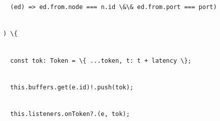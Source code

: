 \documentclass[
]{article}
\newcommand{\passthrough}[1]{#1}
\begin{document}
\passthrough{\lstinline!        !}\passthrough{\lstinline!(!}\passthrough{\lstinline!ed!}\passthrough{\lstinline!)!}\passthrough{\lstinline! !}\passthrough{\lstinline!=>!}\passthrough{\lstinline! !}\passthrough{\lstinline!ed!}\passthrough{\lstinline!.!}\passthrough{\lstinline!from!}\passthrough{\lstinline!.!}\passthrough{\lstinline!node!}\passthrough{\lstinline! !}\passthrough{\lstinline!===!}\passthrough{\lstinline! !}\passthrough{\lstinline!n!}\passthrough{\lstinline!.!}\passthrough{\lstinline!id!}\passthrough{\lstinline! !}\passthrough{\lstinline!\&\&!}\passthrough{\lstinline! !}\passthrough{\lstinline!ed!}\passthrough{\lstinline!.!}\passthrough{\lstinline!from!}\passthrough{\lstinline!.!}\passthrough{\lstinline!port!}\passthrough{\lstinline! !}\passthrough{\lstinline!===!}\passthrough{\lstinline! !}\passthrough{\lstinline!port!}\passthrough{\lstinline!)!}\strut \\
\passthrough{\lstinline!      !}\passthrough{\lstinline!)!}\passthrough{\lstinline! !}\passthrough{\lstinline!\{!}\strut \\
\passthrough{\lstinline!        !}\passthrough{\lstinline!const!}\passthrough{\lstinline! !}\passthrough{\lstinline!tok!}\passthrough{\lstinline!:!}\passthrough{\lstinline! !}\passthrough{\lstinline!Token!}\passthrough{\lstinline! !}\passthrough{\lstinline!=!}\passthrough{\lstinline! !}\passthrough{\lstinline!\{!}\passthrough{\lstinline! !}\passthrough{\lstinline!...!}\passthrough{\lstinline!token!}\passthrough{\lstinline!,!}\passthrough{\lstinline! !}\passthrough{\lstinline!t!}\passthrough{\lstinline!:!}\passthrough{\lstinline! !}\passthrough{\lstinline!t!}\passthrough{\lstinline! !}\passthrough{\lstinline!+!}\passthrough{\lstinline! !}\passthrough{\lstinline!latency!}\passthrough{\lstinline! !}\passthrough{\lstinline!\};!}\strut \\
\passthrough{\lstinline!        !}\passthrough{\lstinline!this!}\passthrough{\lstinline!.!}\passthrough{\lstinline!buffers!}\passthrough{\lstinline!.!}\passthrough{\lstinline!get!}\passthrough{\lstinline!(!}\passthrough{\lstinline!e!}\passthrough{\lstinline!.!}\passthrough{\lstinline!id!}\passthrough{\lstinline")!."}\passthrough{\lstinline!push!}\passthrough{\lstinline!(!}\passthrough{\lstinline!tok!}\passthrough{\lstinline!);!}\strut \\
\passthrough{\lstinline!        !}\passthrough{\lstinline!this!}\passthrough{\lstinline!.!}\passthrough{\lstinline!listeners!}\passthrough{\lstinline!.!}\passthrough{\lstinline!onToken!}\passthrough{\lstinline!?.(!}\passthrough{\lstinline!e!}\passthrough{\lstinline!,!}\passthrough{\lstinline! !}\passthrough{\lstinline!tok!}\passthrough{\lstinline!);!}\strut \\
\end{document}
